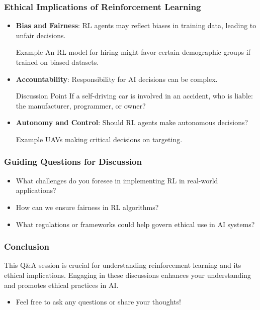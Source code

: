 \documentclass[aspectratio=169]{beamer}
\begin{document}
\begin{frame}[fragile]
  \frametitle{Ethical Implications of Reinforcement Learning}
  \begin{itemize}
    \item \textbf{Bias and Fairness}: RL agents may reflect biases in training data, leading to unfair decisions.
      \begin{block}{Example}
        An RL model for hiring might favor certain demographic groups if trained on biased datasets.
      \end{block}
      
    \item \textbf{Accountability}: Responsibility for AI decisions can be complex.
      \begin{block}{Discussion Point}
        If a self-driving car is involved in an accident, who is liable: the manufacturer, programmer, or owner?
      \end{block}
      
    \item \textbf{Autonomy and Control}: Should RL agents make autonomous decisions?
      \begin{block}{Example}
        UAVs making critical decisions on targeting.
      \end{block}
  \end{itemize}
\end{frame}

\begin{frame}[fragile]
  \frametitle{Guiding Questions for Discussion}
  \begin{itemize}
    \item What challenges do you foresee in implementing RL in real-world applications?
    \item How can we ensure fairness in RL algorithms?
    \item What regulations or frameworks could help govern ethical use in AI systems?
  \end{itemize}
\end{frame}

\begin{frame}[fragile]
  \frametitle{Conclusion}
  This Q\&A session is crucial for understanding reinforcement learning and its ethical implications. Engaging in these discussions enhances your understanding and promotes ethical practices in AI.
  \begin{itemize}
    \item Feel free to ask any questions or share your thoughts!
  \end{itemize}
\end{frame}
\end{document}
